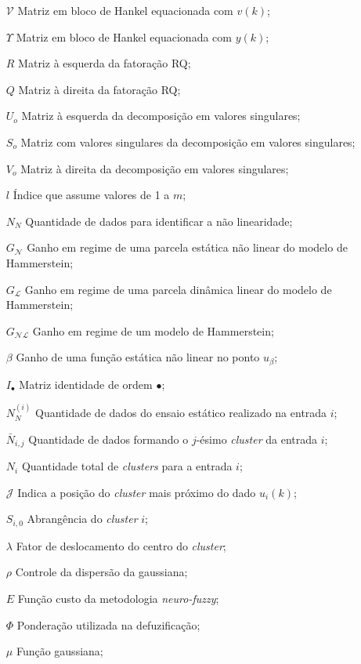 \begin{itemize}[leftmargin=30pt,labelsep=1em,align=left]
	\item[$\mathscr{V}$] Matriz em bloco de Hankel equacionada com $v(k)$;
	\item[$\Upsilon$] Matriz em bloco de Hankel equacionada com $y(k)$;
	\item[$R$] Matriz à esquerda da fatoração RQ;
	\item[$Q$] Matriz à direita da fatoração RQ;
	\item[$U_o$] Matriz à esquerda da decomposição em valores singulares;
	\item[$S_o$] Matriz com valores singulares da decomposição em valores singulares;
	\item[$V_o$] Matriz à direita da decomposição em valores singulares;
	\item[$l$] Índice que assume valores de 1 a $m$;
	\item[$N_N$] Quantidade de dados para identificar a não linearidade;
	\item[$G_\mathcal{N}$] Ganho em regime de uma parcela estática não linear do modelo de Hammerstein;
	\item[$G_\mathcal{L}$] Ganho em regime de uma parcela dinâmica linear do modelo de Hammerstein;
	\item[$G_\mathcal{NL}$] Ganho em regime de um modelo de Hammerstein;
	\item[$\beta$] Ganho de uma função estática não linear no ponto $u_\beta$;
	\item[$I_\bullet$] Matriz identidade de ordem $\bullet$; 
	\item[$N_N^{(i)}$] Quantidade de dados do ensaio estático realizado na entrada $i$;
	\item[$\bar{N}_{i,j}$] Quantidade de dados formando o $j$-ésimo \textit{cluster} da entrada $i$;
	\item[$N_i$] Quantidade total de \textit{clusters} para a entrada $i$;
	\item[$\mathscr{J}$] Indica a posição do \textit{cluster} mais próximo do dado $u_i(k)$;
	\item[$S_{i,0}$] Abrangência do \textit{cluster} $i$;
	\item[$\lambda$] Fator de deslocamento do centro do \textit{cluster};
	\item[$\rho$] Controle da dispersão da gaussiana;
	\item[$E$] Função custo da metodologia \textit{neuro-fuzzy};
	\item[$\Phi$] Ponderação utilizada na defuzificação;
	\item[$\mu$] Função gaussiana;

\end{itemize}
